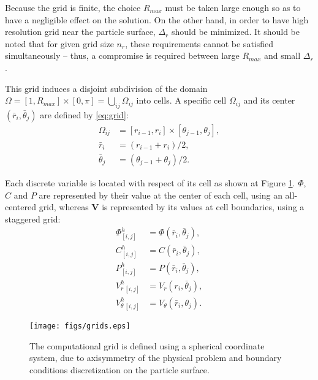 \documentclass[MSc,beforeExam]{iitcsthesis}
\newcommand\bV{\boldsymbol{V}}
\begin{document}
Because the grid is finite, the choice $R_{max}$ must be taken large enough 
so as to have a negligible effect on the solution. 
On the other hand, in order to have high resolution grid near the particle surface,
$\Delta_r$ should be minimized. It should be noted that for given grid size $n_r$,
these requirements cannot be satisfied simultaneously -- thus, a compromise is required
between large $R_{max}$ and small $\Delta_r$.

This grid induces a disjoint subdivision of the domain 
$\Omega = [1, R_{max}] \times [0,\pi] = \bigcup_{ij}\Omega_{ij}$ into cells.
A specific cell $\Omega_{ij}$ and its center $(\bar{r}_i, \bar{\theta}_j)$ are defined by \eqref{eq:grid}:
\begin{align}
\nonumber
\Omega_{ij} &= [r_{i-1}, r_{i}] \times [\theta_{j-1}, \theta_{j}], \\
\bar{r}_i &= (r_{i-1} + r_{i})/2, \\
\nonumber
\bar{\theta}_j &= (\theta_{j-1} + \theta_{j})/2.
\end{align}

Each discrete variable is located with respect of its cell 
as shown at Figure \ref{fig:grids}.
$\varPhi$, $C$ and $P$ are represented by their value at the center of each cell, 
using an all-centered grid, whereas $\bV$ is represented by its values at cell 
boundaries, using a staggered grid:
\begin{align}
\nonumber \varPhi^h_{[i,j]} &= \varPhi(\bar{r}_i, \bar{\theta}_j), \\
\nonumber C^h_{[i,j]} &= C(\bar{r}_i, \bar{\theta}_j), \\
P^h_{[i,j]} &= P(\bar{r}_i, \bar{\theta}_j), \\
\nonumber V_r^h{}_{[i,j]} &= V_r(r_i, \bar{\theta}_j), \\
\nonumber V_\theta^h{}_{[i,j]} &= V_\theta(\bar{r}_i, {\theta}_j).
\end{align}
\begin{figure}[h]
    \begin{center}
	\texttt{[image: figs/grids.eps]}
        \caption[Computational grid]{The computational grid is defined using
        a spherical coordinate system, due to axisymmetry of the physical problem
        and boundary conditions discretization on the particle surface.}
    \label{fig:grids}
    \end{center}
\end{figure}
\end{document}
